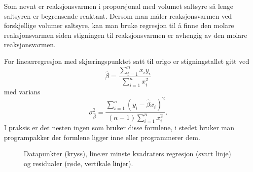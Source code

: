 	Som nevnt er reaksjonsvarmen i  proporsjonal med volumet saltsyre så lenge saltsyren er begrensende reaktant.
	Dersom man måler reaksjonsvarmen ved forskjellige volumer saltsyre, kan man bruke regresjon til å finne den molare reaksjonsvarmen siden stigningen til reaksjonsvarmen er avhengig av den molare reaksjonsvarmen.
	
	For lineærregresjon med skjæringspunktet satt til origo er stigningstallet gitt ved
	\begin{equation}
		\hat{\beta} = \frac{\sum_{i=1}^nx_iy_i}{\sum_{i=1}^nx_i^2}
	\end{equation}
	med varians
	\begin{equation*}
		\sigma_{\hat{\beta}}^2 = \frac{\sum_{i=1}^{n}(y_i-\hat{\beta}x_i)^2}{(n-1)\sum_{i=1}^nx_i^2}.
	\end{equation*}
	I praksis er det nesten ingen som bruker disse formlene, i stedet bruker man programpakker der formlene ligger inne eller programmerer dem.
	
	\begin{figure}[H]
		\centering
		
		\loadedtable
		
		
		
		\caption{Datapunkter (kryss), lineær minste kvadraters regresjon (svart linje) og residualer (røde, vertikale linjer).}
		\label{fig:lsr}
	\end{figure}

